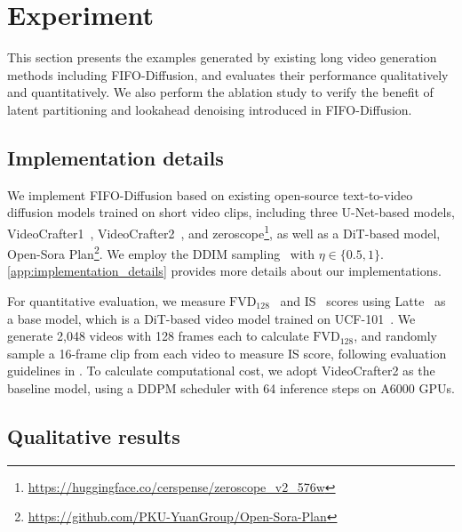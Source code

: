 
\section{Experiment}
\label{sec:experiment}

This section presents the examples generated by existing long video generation methods including FIFO-Diffusion, and evaluates their performance qualitatively and quantitatively.
We also perform the ablation study to verify the benefit of latent partitioning and lookahead denoising introduced in FIFO-Diffusion.

\subsection{Implementation details}
\label{subsec:implementation}

We implement FIFO-Diffusion based on existing open-source text-to-video diffusion models trained on short video clips, including three U-Net-based models, VideoCrafter1~\citep{chen2023videocrafter1},  VideoCrafter2~\citep{chen2024videocrafter2}, and zeroscope\footnote{\url{https://huggingface.co/cerspense/zeroscope\_v2\_576w}}, as well as a DiT-based model, Open-Sora Plan\footnote{\url{https://github.com/PKU-YuanGroup/Open-Sora-Plan}}.
We employ the DDIM sampling~\citep{song2021denoising} with $\eta\in\{0.5, 1\}$.
\cref{app:implementation_details} provides more details about our implementations.

For quantitative evaluation, we measure $\text{FVD}_{128}$~\citep{unterthiner2018towards} and IS~\citep{salimans2016is} scores using Latte~\citep{ma2024latte} as a base model, which is a DiT-based video model trained on UCF-101~\citep{soomro2012ucf}.
We generate 2,048 videos with 128 frames each to calculate $\text{FVD}_{128}$, and randomly sample a 16-frame clip from each video to measure IS score, following evaluation guidelines in \citep{skorokhodov2022styleganv}. To calculate computational cost, we adopt VideoCrafter2 as the baseline model, using a DDPM scheduler with 64 inference steps on A6000 GPUs.


\subsection{Qualitative results}
\label{subsec:qual}

